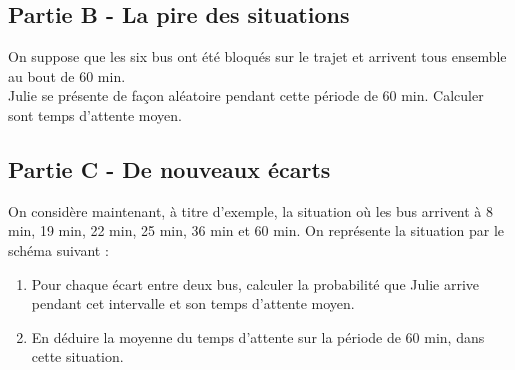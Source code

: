 \documentclass[a4paper,11pt,exos]{nsi} %
\begin{document}
\subsection*{Partie B - La pire des situations}
On suppose que les six bus ont été bloqués sur le trajet et arrivent tous ensemble au bout de 60 min.\\
Julie se présente de façon aléatoire pendant cette période de 60 min. Calculer sont temps d'attente moyen.

\subsection*{Partie C - De nouveaux écarts}
On considère maintenant, à titre d'exemple, la situation où les bus arrivent à 8 min, 19 min, 22 min, 25 min, 36 min et 60 min. On représente la situation par le schéma suivant :
\begin{center}
\end{center}

\begin{enumerate}
    \item Pour chaque écart entre deux bus, calculer la probabilité que Julie arrive pendant cet intervalle et son temps d'attente moyen.
    \item En déduire la moyenne du temps d'attente sur la période de 60 min, dans cette situation.
\end{enumerate}
\end{document}
